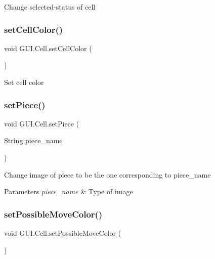 Change selected-\/status of cell \mbox{\label{class_g_u_i_1_1_cell_ad2f8366dabb8e443a3d5a2218ed8c7dd}} 
\subsubsection{\texorpdfstring{setCellColor()}{setCellColor()}}
{\footnotesize\ttfamily void G\+U\+I.\+Cell.\+set\+Cell\+Color (\begin{DoxyParamCaption}{ }\end{DoxyParamCaption})\hspace{0.3cm}{\ttfamily [inline]}}

Set cell color \mbox{\label{class_g_u_i_1_1_cell_a8d20e44749efa5888cb36cc36f8e9544}} 
\subsubsection{\texorpdfstring{setPiece()}{setPiece()}}
{\footnotesize\ttfamily void G\+U\+I.\+Cell.\+set\+Piece (\begin{DoxyParamCaption}\item[{String}]{piece\+\_\+name }\end{DoxyParamCaption})\hspace{0.3cm}{\ttfamily [inline]}}

Change image of piece to be the one corresponding to piece\+\_\+name


\begin{DoxyParams}{Parameters}
{\em piece\+\_\+name} & Type of image \\
\hline
\end{DoxyParams}
\mbox{\label{class_g_u_i_1_1_cell_ae35da89d48d2af82eb085bb6fc41aafd}} 
\subsubsection{\texorpdfstring{setPossibleMoveColor()}{setPossibleMoveColor()}}
{\footnotesize\ttfamily void G\+U\+I.\+Cell.\+set\+Possible\+Move\+Color (\begin{DoxyParamCaption}{ }\end{DoxyParamCaption})\hspace{0.3cm}{\ttfamily [inline]}}

